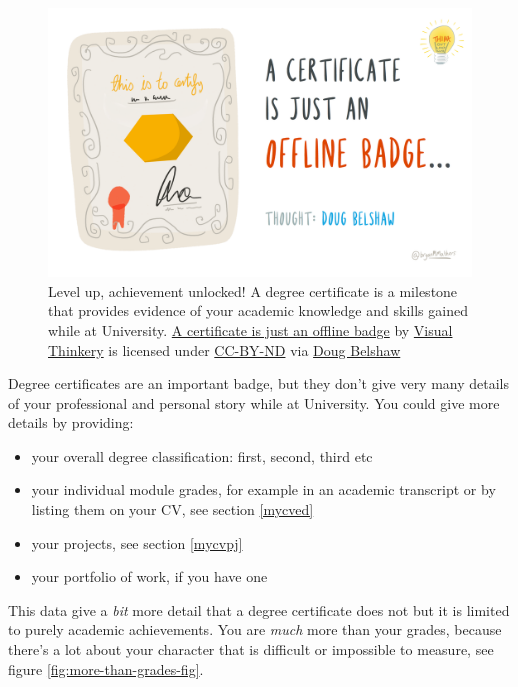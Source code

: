 \documentclass[
]{book}
\providecommand{\tightlist}{%
  \setlength{\itemsep}{0pt}\setlength{\parskip}{0pt}}
\begin{document}
\begin{figure}

{\centering \includegraphics[width=1\linewidth]{images/a-certificate-is-just-a-badge} 

}

\caption{Level up, achievement unlocked! A degree certificate is a milestone that provides evidence of your academic knowledge and skills gained while at University. \href{https://bryanmmathers.com/a-certificate-is-just-an-offline-badge/}{A certificate is just an offline badge} by \href{https://visualthinkery.com/}{Visual Thinkery} is licensed under \href{https://creativecommons.org/licenses/by-nd/4.0/}{CC-BY-ND} via \href{https://dougbelshaw.com/}{Doug Belshaw}}\label{fig:degree-cert-fig}
\end{figure}



Degree certificates are an important badge, but they don't give very many details of your professional and personal story while at University. You could give more details by providing:

\begin{itemize}
\tightlist
\item
  your overall degree classification: first, second, third etc
\item
  your individual module grades, for example in an academic transcript or by listing them on your CV, see section \ref{mycved}
\item
  your projects, see section \ref{mycvpj}
\item
  your portfolio of work, if you have one
\end{itemize}

This data give a \emph{bit} more detail that a degree certificate does not but it is limited to purely academic achievements. You are \emph{much} more than your grades, because there's a lot about your character that is difficult or impossible to measure, see figure \ref{fig:more-than-grades-fig}.
\end{document}
